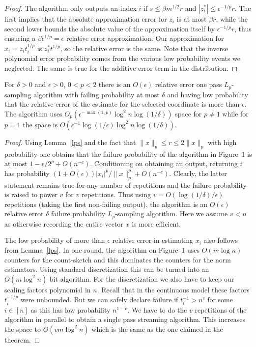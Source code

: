 \begin{proof}
The algorithm only outputs an index $i$ if $s\le\beta m^{1/2}r$ and
$|z^*_i|\le\epsilon^{-1/p}r$. The first implies that the absolute
approximation error for $z_i$ is at most $\beta r$, while the second lower
bounds the absolute value of the approximation itself by $\epsilon^{-1/p}r$,
thus ensuring a $\beta\epsilon^{1/p}=\epsilon$ relative error
approximation. Our approximation for $x_i=z_it_i^{1/p}$ is $z^*_it^{1/p}$, so
the relative error is the same. Note that the
inverse polynomial error probability comes from the various low probability
events we neglected. The same is true for the additive error term in the
distribution.
\end{proof}

\begin{theorem}\label{thm:sampler} For $\delta>0$ and $\epsilon>0$, $0<p<2$ 
 there is an $O(\epsilon)$ relative
  error one pass $L_p$-sampling algorithm with failing probability at most $\delta$ and having
  low probability that the relative error of the estimate for the selected
  coordinate is more than $\epsilon$. 
%  
    The algorithm uses
  $O_p(\epsilon^{-\max(1,p)}\log^2n\log(1/\delta))$ space for $p\ne1$ while
  for $p=1$ the space is
  $O(\epsilon^{-1}\log(1/\epsilon)\log^2n\log(1/\delta))$.
\end{theorem}

\begin{proof}
Using Lemma~\ref{lps} and the fact that $\|x\|_p\le r\le2\|x\|_p$ with high
probability one obtains that the failure probability of the algorithm in Figure~1 
is at most $1-\epsilon/2^p+O(n^{-c})$. Conditioning on
obtaining an output, returning $i$ has probability
$(1+O(\epsilon))|x_i|^p/\|x\|_p^p+O(n^{-c})$. Clearly, the latter statement
remains true for any number of repetitions and the failure probability is
raised to power $v$ for $v$ repetitions. Thus using
$v=O(\log(1/\delta)/\epsilon)$ repetitions (taking the first non-failing output),
 the algorithm is an $O(\epsilon)$
relative error $\delta$ failure probability $L_p$-sampling algorithm. Here we  
assume $v<n$ as otherwise recording the entire vector $x$ is more efficient.

The low probability of more than $\epsilon$ relative error in estimating $x_i$
also follows from Lemma~\ref{lps}.
%
In one round, the algorithm on Figure~1 uses
$O(m\log n)$ counters for the count-sketch and this dominates the
counters for the norm estimators. Using standard discretization this can be
turned into an $O(m\log^2n)$ bit algorithm. For the discretization we also
have to keep our scaling factors polynomial in $n$. Recall that in the
continuous model these factors $t_i^{-1/p}$ were unbounded. But we can safely
declare failure if $t_i^{-1}>n^c$ for some $i\in[n]$ as this has low
probability $n^{1-c}$. We have to do the $v$ repetitions of the algorithm
in parallel to obtain a single pass streaming algorithm. This increases the
space to $O(vm\log^2n)$ which is the same as the one claimed in the theorem.
\end{proof}

